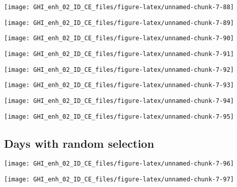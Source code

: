 \documentclass[
  10pt,
  a4paper,oneside]{article}
\begin{document}
\begin{center}\texttt{[image: GHI\_enh\_02\_ID\_CE\_files/figure-latex/unnamed-chunk-7-88]} \end{center}

\begin{center}\texttt{[image: GHI\_enh\_02\_ID\_CE\_files/figure-latex/unnamed-chunk-7-89]} \end{center}

\begin{center}\texttt{[image: GHI\_enh\_02\_ID\_CE\_files/figure-latex/unnamed-chunk-7-90]} \end{center}

\begin{center}\texttt{[image: GHI\_enh\_02\_ID\_CE\_files/figure-latex/unnamed-chunk-7-91]} \end{center}

\begin{center}\texttt{[image: GHI\_enh\_02\_ID\_CE\_files/figure-latex/unnamed-chunk-7-92]} \end{center}

\begin{center}\texttt{[image: GHI\_enh\_02\_ID\_CE\_files/figure-latex/unnamed-chunk-7-93]} \end{center}

\begin{center}\texttt{[image: GHI\_enh\_02\_ID\_CE\_files/figure-latex/unnamed-chunk-7-94]} \end{center}

\begin{center}\texttt{[image: GHI\_enh\_02\_ID\_CE\_files/figure-latex/unnamed-chunk-7-95]} \end{center}

\FloatBarrier

\hypertarget{days-with-random-selection}{%
\subsection{Days with random selection}\label{days-with-random-selection}}

\begin{center}\texttt{[image: GHI\_enh\_02\_ID\_CE\_files/figure-latex/unnamed-chunk-7-96]} \end{center}

\begin{center}\texttt{[image: GHI\_enh\_02\_ID\_CE\_files/figure-latex/unnamed-chunk-7-97]} \end{center}
\end{document}
